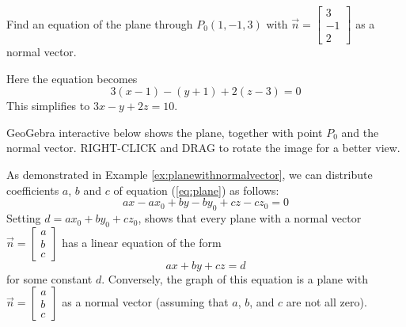 \documentclass{ximera}
\begin{document}
\begin{example}\label{ex:planewithnormalvector}
Find an equation of the plane through $P_{0}(1, -1, 3)$ with $\vec{n} =
\begin{bmatrix}
3\\
-1\\
2
\end{bmatrix}$
 as a normal vector.
\begin{explanation}
  Here the equation becomes
\begin{equation*}
3(x - 1) - (y + 1) + 2(z - 3) = 0
\end{equation*}
This simplifies to $3x - y + 2z = 10$.
 
GeoGebra interactive below shows the plane, together with point $P_0$ and the normal vector.  RIGHT-CLICK and DRAG to rotate the image for a better view.

          

 
 
\begin{onlineOnly}
\begin{center}
\end{center}
\end{onlineOnly}
 
\end{explanation}
\end{example}

 
As demonstrated in Example \ref{ex:planewithnormalvector}, we can distribute coefficients $a$, $b$ and $c$  of equation (\ref{eq:plane}) as follows:
$$ax-ax_0+by-by_0+cz-cz_0=0$$
Setting $d = ax_{0} + by_{0} + cz_{0}$, shows that every plane with a normal vector $\vec{n} =
\begin{bmatrix}
a\\
b\\
c
\end{bmatrix}$
 has a linear equation of the form
\begin{equation} \label{eq:eqofline}
ax + by + cz = d
\end{equation}
for some constant $d$. Conversely, the graph of this equation is a plane with $\vec{n} =
\begin{bmatrix}
a\\
b\\
c
\end{bmatrix}$ as a normal vector (assuming that $a$, $b$, and $c$ are not all zero).
 
\end{document}
